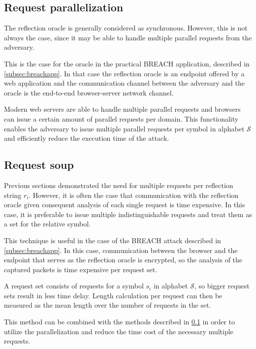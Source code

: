 \documentclass[conference, letterpaper, 10pt]{IEEEtran}
\begin{document}
\subsection{Request parallelization}\label{subsec:parallel}
The reflection oracle is generally considered as synchronous. However, this is not
always the case, since it may be able to handle multiple parallel requests from
the adversary.

This is the case for the oracle in the practical BREACH application, described
in \ref{subsec:breachapp}. In that case the reflection oracle is an endpoint
offered by a web application and the communication channel between the adversary
and the oracle is the end-to-end browser-server network channel.

Modern web servers are able to handle multiple parallel requests and
browsers can issue a certain amount of parallel requests per domain. This
functionality enables the adversary to issue multiple parallel requests per
symbol in alphabet $\mathcal{S}$ and efficiently reduce the execution time of
the attack.

\subsection{Request soup}
Previous sections demonstrated the need for multiple requests per reflection
string $r_i$. However, it is often the case that communication with the
reflection oracle given consequent analysis of each single request is time
expensive. In this case, it is preferable to issue multiple indistinguishable
requests and treat them as a set for the relative symbol.

This technique is useful in the case of the BREACH attack described in
\ref{subsec:breachapp}. In this case, communication between the browser and the
endpoint that serves as the reflection oracle is encrypted, so the analysis of
the captured packets is time expensive per request set.

A request set consists of requests for a symbol $s_i$ in alphabet $\mathcal{S}$,
so bigger request sets result in less time delay. Length calculation per request
can then be measured as the mean length over the number of requests in the set.

This method can be combined with the methods described in \ref{subsec:parallel}
in order to utilize the parallelization and reduce the time cost of the
necessary multiple requests.

\appendices
\end{document}
